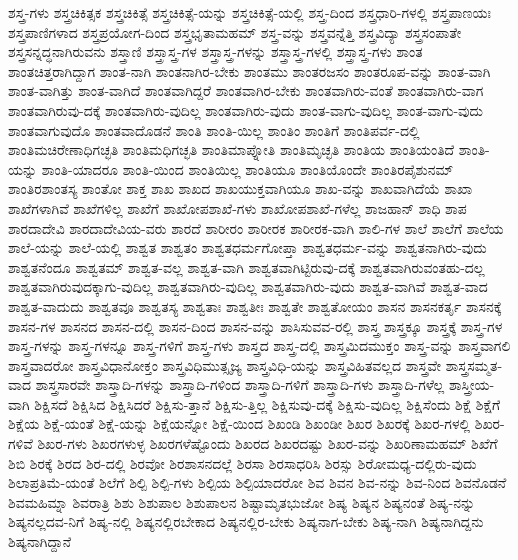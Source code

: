 {ಶಸ್ತ್ರ-ಗಳು
ಶಸ್ತ್ರಚಿಕಿತ್ಸಕ
ಶಸ್ತ್ರಚಿಕಿತ್ಸೆ
ಶಸ್ತ್ರಚಿಕಿತ್ಸೆ-ಯನ್ನು
ಶಸ್ತ್ರಚಿಕಿತ್ಸೆ-ಯಲ್ಲಿ
ಶಸ್ತ್ರ-ದಿಂದ
ಶಸ್ತ್ರಧಾರಿ-ಗಳಲ್ಲಿ
ಶಸ್ತ್ರಪಾಣಯಃ
ಶಸ್ತ್ರಪಾಣಿಗಳಾದ
ಶಸ್ತ್ರಪ್ರಯೋಗ-ದಿಂದ
ಶಸ್ತ್ರಭೃತಾಮಹಮ್
ಶಸ್ತ್ರ-ವನ್ನು
ಶಸ್ತ್ರವನ್ನೆತ್ತಿ
ಶಸ್ತ್ರವಿದ್ಯಾ
ಶಸ್ತ್ರಸಂಪಾತೇ
ಶಸ್ತ್ರಸನ್ನದ್ಧನಾಗಿರುವನು
ಶಸ್ತ್ರಾಣಿ
ಶಸ್ತ್ರಾಸ್ತ್ರ-ಗಳ
ಶಸ್ತ್ರಾಸ್ತ್ರ-ಗಳನ್ನು
ಶಸ್ತ್ರಾಸ್ತ್ರ-ಗಳಲ್ಲಿ
ಶಸ್ತ್ರಾಸ್ತ್ರ-ಗಳು
ಶಾಂತ
ಶಾಂತಚಿತ್ತರಾಗಿದ್ದಾಗ
ಶಾಂತ-ನಾಗಿ
ಶಾಂತನಾಗಿರ-ಬೇಕು
ಶಾಂತಮು
ಶಾಂತರಜಸಂ
ಶಾಂತರೂಪ-ವನ್ನು
ಶಾಂತ-ವಾಗಿ
ಶಾಂತ-ವಾಗಿತ್ತು
ಶಾಂತ-ವಾಗಿದೆ
ಶಾಂತವಾಗಿದ್ದರೆ
ಶಾಂತವಾಗಿರ-ಬೇಕು
ಶಾಂತವಾಗಿರು-ವಂತೆ
ಶಾಂತವಾಗಿರು-ವಾಗ
ಶಾಂತವಾಗಿರುವು-ದಕ್ಕೆ
ಶಾಂತವಾಗಿರು-ವುದಿಲ್ಲ
ಶಾಂತವಾಗಿರು-ವುದು
ಶಾಂತ-ವಾಗು-ವುದಿಲ್ಲ
ಶಾಂತ-ವಾಗು-ವುದು
ಶಾಂತವಾಗುವುದೊ
ಶಾಂತವಾದೊಡನೆ
ಶಾಂತಿ
ಶಾಂತಿ-ಯಿಲ್ಲ
ಶಾಂತಿಂ
ಶಾಂತಿಗೆ
ಶಾಂತಿಪರ್ವ-ದಲ್ಲಿ
ಶಾಂತಿಮಚಿರೇಣಾಧಿಗಚ್ಛತಿ
ಶಾಂತಿಮಧಿಗಚ್ಛತಿ
ಶಾಂತಿಮಾಪ್ನೋತಿ
ಶಾಂತಿಮೃಚ್ಛತಿ
ಶಾಂತಿಯ
ಶಾಂತಿಯಂತಿದೆ
ಶಾಂತಿ-ಯನ್ನು
ಶಾಂತಿ-ಯಾದರೂ
ಶಾಂತಿ-ಯಿಂದ
ಶಾಂತಿಯಿಲ್ಲ
ಶಾಂತಿಯೂ
ಶಾಂತಿಯೊಂದೇ
ಶಾಂತಿರಪೈಶುನಮ್
ಶಾಂತಿರಶಾಂತಸ್ಯ
ಶಾಂತೋ
ಶಾಕ್ತ
ಶಾಖ
ಶಾಖದ
ಶಾಖಯುಕ್ತವಾಗಿಯೂ
ಶಾಖ-ವನ್ನು
ಶಾಖವಾಗಿದೆಯೆ
ಶಾಖಾ
ಶಾಖೆಗಳಾಗಿವೆ
ಶಾಖೆಗಳಿಲ್ಲ
ಶಾಖೆಗೆ
ಶಾಖೋಪಶಾಖೆ-ಗಳು
ಶಾಖೋಪಶಾಖೆ-ಗಳೆಲ್ಲ
ಶಾಜಹಾನ್
ಶಾಧಿ
ಶಾಪ
ಶಾರದಾದೇವಿ
ಶಾರದಾದೇವಿಯ-ವರು
ಶಾರದೆ
ಶಾರೀರಂ
ಶಾರೀರಕ
ಶಾರೀರಕ-ವಾಗಿ
ಶಾಲಿ-ಗಳ
ಶಾಲೆ
ಶಾಲೆಗೆ
ಶಾಲೆಯ
ಶಾಲೆ-ಯನ್ನು
ಶಾಲೆ-ಯಲ್ಲಿ
ಶಾಶ್ವತ
ಶಾಶ್ವತಂ
ಶಾಶ್ವತಧರ್ಮಗೋಪ್ತಾ
ಶಾಶ್ವತಧರ್ಮ-ವನ್ನು
ಶಾಶ್ವತನಾಗಿರು-ವುದು
ಶಾಶ್ವತನೆಂದೂ
ಶಾಶ್ವತಮ್
ಶಾಶ್ವತ-ವಲ್ಲ
ಶಾಶ್ವತ-ವಾಗಿ
ಶಾಶ್ವತವಾಗಿಟ್ಟಿರುವು-ದಕ್ಕೆ
ಶಾಶ್ವತವಾಗಿರುವಂತಹು-ದಲ್ಲ
ಶಾಶ್ವತವಾಗಿರುವುದಕ್ಕಾಗು-ವುದಿಲ್ಲ
ಶಾಶ್ವತವಾಗಿರು-ವುದಿಲ್ಲ
ಶಾಶ್ವತವಾಗಿರು-ವುದು
ಶಾಶ್ವತ-ವಾಗಿವೆ
ಶಾಶ್ವತ-ವಾದ
ಶಾಶ್ವತ-ವಾದುದು
ಶಾಶ್ವತವೂ
ಶಾಶ್ವತಸ್ಯ
ಶಾಶ್ವತಾಃ
ಶಾಶ್ವತೀಃ
ಶಾಶ್ವತೇ
ಶಾಶ್ವತೋಯಂ
ಶಾಸನ
ಶಾಸನಕರ್ತೃ
ಶಾಸನಕ್ಕೆ
ಶಾಸನ-ಗಳ
ಶಾಸನದ
ಶಾಸನ-ದಲ್ಲಿ
ಶಾಸನ-ದಿಂದ
ಶಾಸನ-ವನ್ನು
ಶಾಸಿಸುವವ-ರಲ್ಲಿ
ಶಾಸ್ತ್ರ
ಶಾಸ್ತ್ರಕ್ಕೂ
ಶಾಸ್ತ್ರಕ್ಕೆ
ಶಾಸ್ತ್ರ-ಗಳ
ಶಾಸ್ತ್ರ-ಗಳನ್ನು
ಶಾಸ್ತ್ರ-ಗಳನ್ನೂ
ಶಾಸ್ತ್ರ-ಗಳಿಗೆ
ಶಾಸ್ತ್ರ-ಗಳು
ಶಾಸ್ತ್ರದ
ಶಾಸ್ತ್ರ-ದಲ್ಲಿ
ಶಾಸ್ತ್ರಮಿದಮುಕ್ತಂ
ಶಾಸ್ತ್ರ-ವನ್ನು
ಶಾಸ್ತ್ರವಾಗಲಿ
ಶಾಸ್ತ್ರವಾದರೋ
ಶಾಸ್ತ್ರವಿಧಾನೋಕ್ತಂ
ಶಾಸ್ತ್ರವಿಧಿಮುತ್ಸೃಜ್ಯ
ಶಾಸ್ತ್ರವಿಧಿ-ಯನ್ನು
ಶಾಸ್ತ್ರವಿಹಿತವಲ್ಲದ
ಶಾಸ್ತ್ರವೇ
ಶಾಸ್ತ್ರಸಮ್ಮತ-ವಾದ
ಶಾಸ್ತ್ರಸಾರವೇ
ಶಾಸ್ತ್ರಾದಿ-ಗಳನ್ನು
ಶಾಸ್ತ್ರಾದಿ-ಗಳಿಂದ
ಶಾಸ್ತ್ರಾದಿ-ಗಳಿಗೆ
ಶಾಸ್ತ್ರಾದಿ-ಗಳು
ಶಾಸ್ತ್ರಾದಿ-ಗಳೆಲ್ಲ
ಶಾಸ್ತ್ರೀಯ-ವಾಗಿ
ಶಿಕ್ಷಿಸದೆ
ಶಿಕ್ಷಿಸಿದ
ಶಿಕ್ಷಿಸಿದರೆ
ಶಿಕ್ಷಿಸು-ತ್ತಾನೆ
ಶಿಕ್ಷಿಸು-ತ್ತಿಲ್ಲ
ಶಿಕ್ಷಿಸುವು-ದಕ್ಕೆ
ಶಿಕ್ಷಿಸು-ವುದಿಲ್ಲ
ಶಿಕ್ಷಿಸೆಂದು
ಶಿಕ್ಷೆ
ಶಿಕ್ಷೆಗೆ
ಶಿಕ್ಷೆಯ
ಶಿಕ್ಷೆ-ಯಂತೆ
ಶಿಕ್ಷೆ-ಯನ್ನು
ಶಿಕ್ಷೆಯನ್ನೋ
ಶಿಕ್ಷೆ-ಯಿಂದ
ಶಿಖಂಡಿ
ಶಿಖಂಡೀ
ಶಿಖರ
ಶಿಖರಕ್ಕೆ
ಶಿಖರ-ಗಳಲ್ಲಿ
ಶಿಖರ-ಗಳಿವೆ
ಶಿಖರ-ಗಳು
ಶಿಖರಗಳುಳ್ಳ
ಶಿಖರಗಳೆಷ್ಟೊಂದು
ಶಿಖರದ
ಶಿಖರದಷ್ಟು
ಶಿಖರ-ವನ್ನು
ಶಿಖರಿಣಾಮಹಮ್
ಶಿಖೆಗೆ
ಶಿಬಿ
ಶಿರಕ್ಕೆ
ಶಿರದ
ಶಿರ-ದಲ್ಲಿ
ಶಿರವೋ
ಶಿರಶಾಸನದಲ್ಲೆ
ಶಿರಸಾ
ಶಿರಸಾಧರಿಸಿ
ಶಿರಸ್ಸು
ಶಿರೋಮಧ್ಯ-ದಲ್ಲಿರು-ವುದು
ಶಿಲಾಪ್ರತಿಮೆ-ಯಂತೆ
ಶಿಲೆಗೆ
ಶಿಲ್ಪಿ
ಶಿಲ್ಪಿ-ಗಳು
ಶಿಲ್ಪಿಯ
ಶಿಲ್ಪಿಯಾದರೋ
ಶಿವ
ಶಿವನ
ಶಿವ-ನನ್ನು
ಶಿವ-ನಿಂದ
ಶಿವನೊಡನೆ
ಶಿವಮಹಿಮ್ನಾ
ಶಿವರಾತ್ರಿ
ಶಿಶು
ಶಿಶುಪಾಲ
ಶಿಶುಪಾಲನ
ಶಿಷ್ಟಾಮೃತಭುಜೋ
ಶಿಷ್ಯ
ಶಿಷ್ಯನ
ಶಿಷ್ಯನಂತೆ
ಶಿಷ್ಯ-ನನ್ನು
ಶಿಷ್ಯನಲ್ಲದವ-ನಿಗೆ
ಶಿಷ್ಯ-ನಲ್ಲಿ
ಶಿಷ್ಯನಲ್ಲಿರಬೇಕಾದ
ಶಿಷ್ಯನಲ್ಲಿರ-ಬೇಕು
ಶಿಷ್ಯನಾಗ-ಬೇಕು
ಶಿಷ್ಯ-ನಾಗಿ
ಶಿಷ್ಯನಾಗಿದ್ದನು
ಶಿಷ್ಯನಾಗಿದ್ದಾನೆ
}
